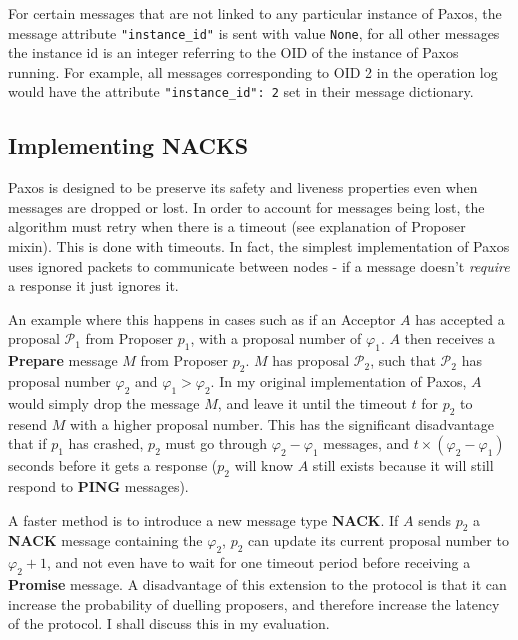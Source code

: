 \documentclass[12pt,twoside,notitlepage]{report}
\newcommand{\msg}[1] {{\bf #1}}         %
\begin{document}
For certain messages that are not linked to any particular instance of Paxos, the message
attribute \verb+"instance_id"+ is sent with value \verb+None+, for all other messages the instance
id is an integer referring to the OID of the instance of Paxos running. For example, all messages
corresponding to OID 2 in the operation log would have the attribute \verb+"instance_id": 2+ set
in their message dictionary.

\subsection{Implementing NACKS}

Paxos is designed to be preserve its safety and liveness properties even when messages are dropped
or lost. In order to account for messages being lost, the algorithm must retry when there is a
timeout (see explanation of Proposer mixin). This is done with timeouts. In fact, the simplest
implementation of Paxos uses ignored packets to communicate between nodes - if a message doesn't
\emph{require} a response it just ignores it.

An example where this happens in cases such as if an Acceptor $A$ has accepted a proposal
$\mathcal{P}_1$ from Proposer $p_1$, with a proposal number of $\varphi_1$. $A$ then receives a
\msg{Prepare} message $M$ from Proposer $p_2$. $M$ has proposal $\mathcal{P}_2$, such that
$\mathcal{P}_2$ has proposal number $\varphi_2$ and $\varphi_1 > \varphi_2$. In my original
implementation of Paxos, $A$ would simply drop the message $M$, and leave it until the timeout $t$
for $p_2$ to resend $M$ with a higher proposal number. This has the significant disadvantage that
if $p_1$ has crashed, $p_2$ must go through $\varphi_2 - \varphi_1$ messages, and $t\times
(\varphi_2 - \varphi_1)$ seconds before it gets a response ($p_2$ will know $A$ still exists
because it will still respond to \msg{PING} messages).


A faster method is to introduce a new message type \msg{NACK}. If $A$ sends $p_2$ a \msg{NACK}
message containing the $\varphi_2$, $p_2$ can update its current proposal number to $\varphi_2 +
1$, and not even have to wait for one timeout period before receiving a \msg{Promise} message. A
disadvantage of this extension to the protocol is that it can increase the probability of duelling
proposers, and therefore increase the latency of the protocol. I shall discuss this in my
evaluation.
\end{document}
